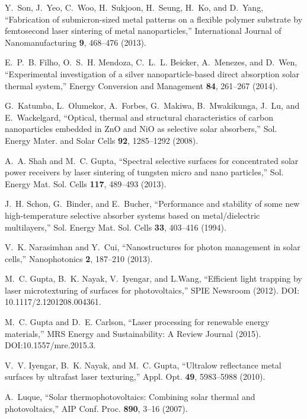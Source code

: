 \documentclass[10pt,letterpaper]{article}
\begin{document}
\begin{thebibliography}{100}
Y.~Son, J.~Yeo, C.~Woo, H.~Sukjoon, H.~Seung, H.~Ko, and D.~Yang,
  \enquote{Fabrication of submicron-sized metal patterns on a flexible polymer
  substrate by femtosecond laser sintering of metal nanoparticles,}
  International Journal of Nanomanufacturing \textbf{9}, 468--476 (2013).

E.~P.~B. Filho, O.~S.~H. Mendoza, C.~L.~L. Beicker, A.~Menezes, and D.~Wen,
  \enquote{Experimental investigation of a silver nanoparticle-based direct
  absorption solar thermal system,} Energy Conversion and Management
  \textbf{84}, 261--267 (2014).

G.~Katumba, L.~Olumekor, A.~Forbes, G.~Makiwa, B.~Mwakikunga, J.~Lu, and
  E.~Wackelgard, \enquote{Optical, thermal and structural characteristics of
  carbon nanoparticles embedded in {Z}n{O} and {N}i{O} as selective solar
  absorbers,} Sol. Energy Mater. and Solar Cells \textbf{92}, 1285--1292
  (2008).

A.~A. Shah and M.~C. Gupta, \enquote{Spectral selective surfaces for
  concentrated solar power receivers by laser sintering of tungsten micro and
  nano particles,} Sol. Energy Mat. Sol. Cells \textbf{117}, 489--493 (2013).

J.~H. Schon, G.~Binder, and E.~Bucher, \enquote{Performance and stability of
  some new high-temperature selective absorber systems based on
  metal/dielectric multilayers,} Sol. Energy Mat. Sol. Cells \textbf{33},
  403--416 (1994).

V.~K. Narasimhan and Y.~Cui, \enquote{Nanostructures for photon management in
  solar cells,} Nanophotonics \textbf{2}, 187–210 (2013).

M.~C. Gupta, B.~K. Nayak, V.~Iyengar, and L.Wang, \enquote{Efficient light
  trapping by laser microtexturing of surfaces for photovoltaics,} SPIE
  Newsroom  (2012). DOI: 10.1117/2.1201208.004361.

M.~C. Gupta and D.~E. Carlson, \enquote{Laser processing for renewable energy
  materials,} MRS Energy and Sustainability: A Review Journal  (2015).
  DOI:10.1557/mre.2015.3.

V.~V. Iyengar, B.~K. Nayak, and M.~C. Gupta, \enquote{Ultralow reflectance
  metal surfaces by ultrafast laser texturing,} Appl. Opt. \textbf{49},
  5983--5988 (2010).

A.~Luque, \enquote{Solar thermophotovoltaics: Combining solar thermal and
  photovoltaics,} AIP Conf. Proc. \textbf{890}, 3--16 (2007).


\end{thebibliography}
\end{document}
